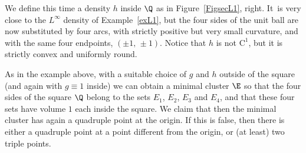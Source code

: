 \begin{example}\label{exL2}
We define this time a density $h$ inside $\Q$ as in Figure~\ref{FigsecL1}, right. It~is very close to the $L^\infty$ density of Example~\ref{exL1}, but the four sides of the unit ball are now substituted by four arcs, with strictly positive but very small curvature, and with the same four endpoints, \ie $(\pm 1,\,\pm 1)$. Notice that $h$ is not $\mathrm{C}^1$, but it is strictly convex and uniformly round.

As in the example above, with a suitable choice of $g$ and $h$ outside of the square (and again with $g\equiv 1$ inside) we can obtain a minimal cluster $\E$ so that the four sides of the square $\Q$ belong to the sets $E_1$, $E_2$, $E_3$ and $E_4$, and that these four sets have volume $1$ each inside the square. We claim that then the minimal cluster has again a quadruple point at the origin. If this is false, then there is either a quadruple point at a point different from the origin, or (at least) two triple points.


\end{example}
